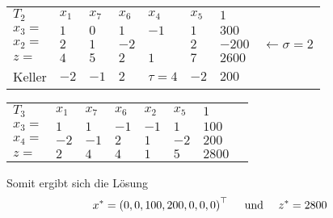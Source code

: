 \begin{beispiel}
\begin{indentpar}
		\begin{tabular}{R{1cm}|R{.5cm}R{.5cm}R{.5cm}R{.5cm}R{.5cm}|R{.9cm}l}
			$T_2$   & $x_1$ & $x_7$ & $x_6$ & $x_4$      & $x_5$ & $1$ \\ 
			$x_3 =$ & $1$   & $0$   & $1$   & $-1$       & $1$   & $300$  \\
			$x_2 =$ & $2$   & $1$   & $-2$  &  & $2$   & $-200$ & $\leftarrow \sigma = 2$ \\ 
			$z =$   & $4$   & $5$   & $2$   & $1$        & $7$   & $2600$ \\ 
			Keller  & $-2$  & $-1$  & $2$   & $\tau = 4$ & $-2$  & $200$
		\end{tabular}
	
		\begin{tabular}{R{1cm}|R{.5cm}R{.5cm}R{.5cm}R{.5cm}R{.5cm}|R{.9cm}l}
			$T_3$   & $x_1$ & $x_7$ & $x_6$ & $x_2$ & $x_5$ & $1$ \\ 
			$x_3 =$ & $1$   & $1$   & $-1$   & $-1$  & $1$   & $100$  \\
			$x_4 =$ & $-2$   & $-1$   & $2$  & $1$   & $-2$   & $200$ \\ 
			$z =$   & $2$   & $4$   & $4$   & $1$   & $5$   & $2800$ \\
		\end{tabular}
	\end{indentpar}

	Somit ergibt sich die Lösung
	\begin{equation*}
		x^\ast = \left( 0,0,100,200,0,0,0 \right)^{\top} \quad \text{ und } \quad z^\ast = 2800
	\end{equation*}
\end{beispiel}